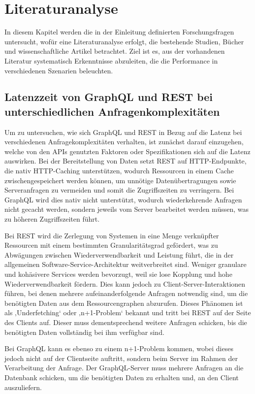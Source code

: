 \chapter{Literaturanalyse} %
\label{sec:analyse}
In diesem Kapitel werden die in der Einleitung definierten Forschungsfragen untersucht, wofür eine Literaturanalyse erfolgt, die bestehende Studien, Bücher und wissenschaftliche Artikel betrachtet. Ziel ist es, aus der vorhandenen Literatur systematisch Erkenntnisse abzuleiten, die die Performance in verschiedenen Szenarien beleuchten.

\section{Latenzzeit von GraphQL und REST bei unterschiedlichen Anfragenkomplexitäten} %
\label{sec:ff1}
Um zu untersuchen, wie sich GraphQL und REST in Bezug auf die Latenz bei verschiedenen Anfragekomplexitäten verhalten, ist zunächst darauf einzugehen, welche von den APIs genutzten Faktoren oder Spezifikationen sich auf die Latenz auswirken. Bei der Bereitstellung von Daten setzt REST auf HTTP-Endpunkte, die nativ HTTP-Caching unterstützen, wodurch Ressourcen in einem Cache zwischengespeichert werden können, um unnötige Datenübertragungen sowie Serveranfragen zu vermeiden und somit die Zugriffszeiten zu verringern. Bei GraphQL wird dies nativ nicht unterstützt, wodurch wiederkehrende Anfragen nicht gecacht werden, sondern jeweils vom Server bearbeitet werden müssen, was zu höheren Zugriffszeiten führt.  \citep{graphqlreplacerest}

\noindent
Bei REST wird die Zerlegung von Systemen in eine Menge verknüpfter Ressourcen mit einem bestimmten Granularitätsgrad gefördert, was zu Abwägungen zwischen Wiederverwendbarkeit und Leistung führt, die in der allgemeinen Software-Service-Architektur weitverbreitet sind. Weniger granulare und kohäsivere Services werden bevorzugt, weil sie lose Kopplung und hohe Wiederverwendbarkeit fördern. Dies kann jedoch zu Client-Server-Interaktionen führen, bei denen mehrere aufeinanderfolgende Anfragen notwendig sind, um die benötigten Daten aus dem Ressourcengraphen abzurufen. Dieses Phänomen ist als ‚Underfetching‘ oder ‚n+1-Problem‘ bekannt und tritt bei REST auf der Seite des Clients auf. Dieser muss dementsprechend weitere Anfragen schicken, bis die benötigten Daten vollständig bei ihm verfügbar sind.  \citep{graphqlhealth} \citep{migrategraphql}

\noindent
Bei GraphQL kann es ebenso zu einem n+1-Problem kommen, wobei dieses jedoch nicht auf der Clientseite auftritt, sondern beim Server im Rahmen der Verarbeitung der Anfrage. Der GraphQL-Server muss mehrere Anfragen an die Datenbank schicken, um die benötigten Daten zu erhalten und, an den Client auszuliefern. 
\citep{graphqlsemantics}

